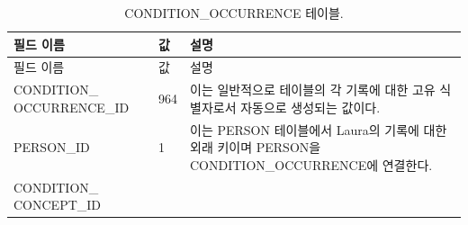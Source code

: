 \documentclass[10.5pt]{book}
\theoremstyle{definition}
\theoremstyle{definition}
\theoremstyle{definition}
\theoremstyle{remark}
\begin{document}
\begin{longtable}[]{@{}lll@{}}
\caption{\label{tab:conditionOccurrence} CONDITION\_OCCURRENCE
테이블.}\tabularnewline
\toprule
\begin{minipage}[b]{0.28\columnwidth}\raggedright\strut
필드 이름\strut
\end{minipage} & \begin{minipage}[b]{0.16\columnwidth}\raggedright\strut
값\strut
\end{minipage} & \begin{minipage}[b]{0.48\columnwidth}\raggedright\strut
설명\strut
\end{minipage}\tabularnewline
\midrule
\endfirsthead
\toprule
\begin{minipage}[b]{0.28\columnwidth}\raggedright\strut
필드 이름\strut
\end{minipage} & \begin{minipage}[b]{0.16\columnwidth}\raggedright\strut
값\strut
\end{minipage} & \begin{minipage}[b]{0.48\columnwidth}\raggedright\strut
설명\strut
\end{minipage}\tabularnewline
\midrule
\endhead
\begin{minipage}[t]{0.28\columnwidth}\raggedright\strut
CONDITION\_ OCCURRENCE\_ID\strut
\end{minipage} & \begin{minipage}[t]{0.16\columnwidth}\raggedright\strut
964\strut
\end{minipage} & \begin{minipage}[t]{0.48\columnwidth}\raggedright\strut
이는 일반적으로 테이블의 각 기록에 대한 고유 식별자로서 자동으로
생성되는 값이다.\strut
\end{minipage}\tabularnewline
\begin{minipage}[t]{0.28\columnwidth}\raggedright\strut
PERSON\_ID\strut
\end{minipage} & \begin{minipage}[t]{0.16\columnwidth}\raggedright\strut
1\strut
\end{minipage} & \begin{minipage}[t]{0.48\columnwidth}\raggedright\strut
이는 PERSON 테이블에서 Laura의 기록에 대한 외래 키이며 PERSON을
CONDITION\_OCCURRENCE에 연결한다.\strut
\end{minipage}\tabularnewline
\begin{minipage}[t]{0.28\columnwidth}\raggedright\strut
CONDITION\_ CONCEPT\_ID\strut
\end{minipage} & \begin{minipage}[t]{0.16\columnwidth}\raggedright\strut

\end{minipage}
\end{longtable}
\end{document}
